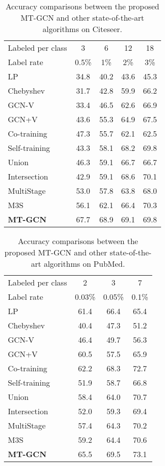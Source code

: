 \documentclass{article}
\begin{document}
\begin{table}[!ht]
\caption{Accuracy comparisons between the proposed MT-GCN and other state-of-the-art algorithms on Citeseer.}
\label{citeseer}
\centering
\begin{tabular}{l|cccc}
\hline
Labeled per class&3     & 6     & 12    & 18    \\
Label rate      &0.5\%  & 1\%   & 2\%   & 3\%   \\
\hline
LP              &34.8   &40.2   &43.6   &45.3   \\
Chebyshev       &31.7   &42.8   &59.9   &66.2   \\
GCN-V           &33.4   &46.5   &62.6   &66.9   \\
GCN+V           &43.6   &55.3   &64.9   &67.5   \\
Co-training     &47.3   &55.7   &62.1   &62.5   \\
Self-training   &43.3   &58.1   &68.2   &69.8   \\
Union           &46.3   &59.1   &66.7   &66.7   \\
Intersection    &42.9   &59.1   &68.6   &70.1   \\
MultiStage      &53.0   &57.8   &63.8   &68.0   \\
M3S             &56.1   &62.1   &66.4   &70.3   \\
\bf MT-GCN      &67.7   &68.9   &69.1   &69.8   \\
\hline
\end{tabular}
\end{table}
\begin{table}[!ht]
\caption{Accuracy comparisons between the proposed MT-GCN and other state-of-the-art algorithms on PubMed.}
\label{pubmed}
\centering
\begin{tabular}{l|ccc}
\hline
Labeled per class&2   & 3     & 7     \\
Label rate      &0.03\% &0.05\% &0.1\% \\
\hline
LP              &61.4   &66.4   &65.4\\
Chebyshev       &40.4   &47.3   &51.2\\
GCN-V           &46.4   &49.7   &56.3\\
GCN+V           &60.5   &57.5   &65.9\\
Co-training     &62.2   &68.3   &72.7\\
Self-training   &51.9   &58.7   &66.8\\
Union           &58.4   &64.0   &70.7\\
Intersection    &52.0   &59.3   &69.4\\
MultiStage      &57.4   &64.3   &70.2\\
M3S             &59.2   &64.4   &70.6\\
\bf MT-GCN      &65.5   &69.5   &73.1\\
\hline
\end{tabular}
\end{table}
\end{document}

